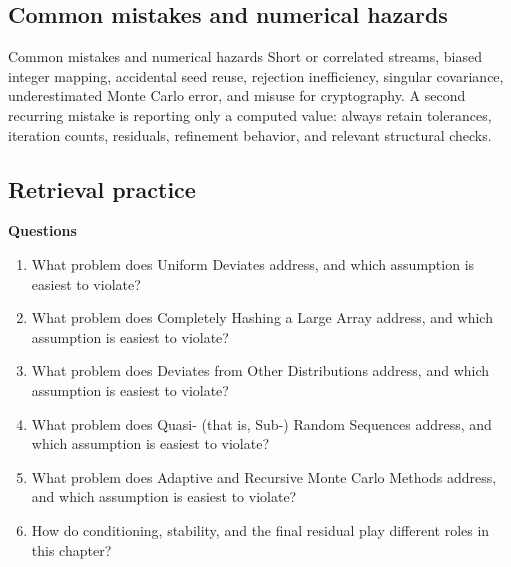 \documentclass[10pt,letterpaper]{article}
\begin{document}
\subsection*{Common mistakes and numerical hazards}
\begin{warnbox}{Common mistakes and numerical hazards}
Short or correlated streams, biased integer mapping, accidental seed reuse, rejection inefficiency, singular covariance, underestimated Monte Carlo error, and misuse for cryptography.  A second recurring mistake is reporting only a computed value: always retain tolerances, iteration counts, residuals, refinement behavior, and relevant structural checks.
\end{warnbox}

\subsection*{Retrieval practice}
\textbf{Questions}
\begin{enumerate}
\item What problem does Uniform Deviates address, and which assumption is easiest to violate?
\item What problem does Completely Hashing a Large Array address, and which assumption is easiest to violate?
\item What problem does Deviates from Other Distributions address, and which assumption is easiest to violate?
\item What problem does Quasi- (that is, Sub-) Random Sequences address, and which assumption is easiest to violate?
\item What problem does Adaptive and Recursive Monte Carlo Methods address, and which assumption is easiest to violate?
\item How do conditioning, stability, and the final residual play different roles in this chapter?
\end{enumerate}
\end{document}
